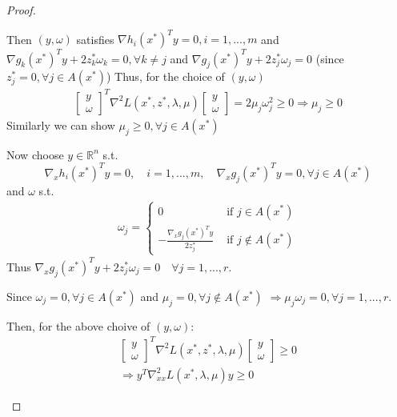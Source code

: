 \documentclass[11pt,a4paper]{article}
\begin{document}
\begin{proof}
\begin{enumerate}[(1)]
    Then $(y,\omega)$ satisfies $\nabla h_i(x^*)^Ty=0,i=1,...,m$ and $\nabla g_k(x^*)^Ty+2z^*_k\omega_k=0,\forall k\neq j$ and $\nabla g_j(x^*)^Ty+2z_j^*\omega_j=0$ (since $z_j^*=0,\forall j\in A(x^*)$)
    Thus, for the choice of $(y,\omega)$
    \begin{equation}
        \begin{aligned}
            \begin{bmatrix}
                y\\
                \omega
            \end{bmatrix}^T \nabla^2L(x^*,z^*,\lambda,\mu)\begin{bmatrix}
                y\\
                \omega
            \end{bmatrix}=2\mu_j\omega_j^2\geq 0 \Rightarrow \mu_j\geq 0
        \end{aligned}
        \nonumber
    \end{equation}
    Similarly we can show $\mu_j\geq 0,\forall j\in A(x^*)$

    Now choose $y\in \mathbb{R}^n$ s.t. $$\nabla_x h_i(x^*)^T y=0,\quad i=1,...,m,\quad \nabla_x g_j(x^*)^T y=0,\forall j\in A(x^*)$$
    and $\omega$ s.t.
    \begin{equation}
        \begin{aligned}
            \omega_j=\left\{\begin{matrix}
                0&\text{ if }j\in A(x^*)\\
                -\frac{\nabla_x g_j(x^*)^T y}{2z_j^*}&\text{ if }j\notin A(x^*)
            \end{matrix}\right.
        \end{aligned}
        \nonumber
    \end{equation}
    Thus $\nabla_x g_j(x^*)^T y+2z_j^*\omega_j=0\quad \forall j=1,...,r$.
    
    Since $\omega_j=0,\forall j\in A(x^*)$ and $\mu_j=0,\forall j\notin A(x^*)$ $\Rightarrow \mu_j\omega_j=0,\forall j=1,...,r$.

    Then, for the above choive of $(y,\omega)$:
    \begin{equation}
        \begin{aligned}
            \begin{bmatrix}
                y\\
                \omega
            \end{bmatrix}^T \nabla^2L(x^*,z^*,\lambda,\mu)\begin{bmatrix}
                y\\
                \omega
            \end{bmatrix}\geq 0\\
            \Rightarrow	 y^T \nabla^2_{xx}L(x^*,\lambda,\mu)y\geq 0
        \end{aligned}
        \nonumber
    \end{equation}
\end{enumerate}



\end{proof}
\end{document}
